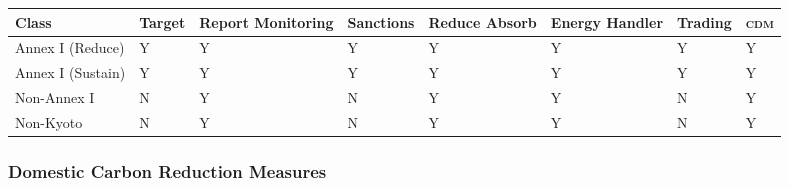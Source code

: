 \begin{tabular}{p{2.8cm} | p{1.1cm} | p{1.6cm} | p{1.5cm} | p{1.2cm} | p{1.3cm} | p{1.3cm} | p{0.7cm}} 
\firsthline
Class &	Target & Report \newline Monitoring & Sanctions & Reduce \newline Absorb & Energy \newline Handler & Trading & \textsc{cdm} \\ \hline
Annex I (Reduce) &	Y & Y &	Y & Y & Y & Y & Y \\
Annex I (Sustain) & Y & Y & Y & Y & Y & Y & Y \\
Non-Annex I	& N & Y & N & Y & Y & N & Y \\
Non-Kyoto & N & Y & N & Y & Y & N & Y \\
\end{tabular}

\subsubsection{Domestic Carbon Reduction Measures}

